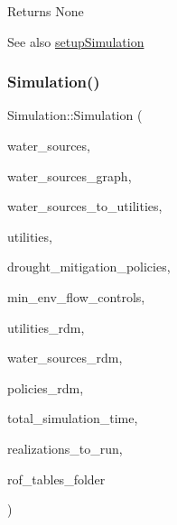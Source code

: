 \begin{DoxyReturn}{Returns}
None
\end{DoxyReturn}
\begin{DoxySeeAlso}{See also}
\mbox{\hyperlink{classSimulation_ac9ff965191f13b1ce044344fd1e5d0ac}{setup\+Simulation}} 
\end{DoxySeeAlso}
\mbox{\label{classSimulation_a68f43435cf8308d5415cdfcdb84e1fac}} 
\subsubsection{\texorpdfstring{Simulation()}{Simulation()}\hspace{0.1cm}{\footnotesize\ttfamily [4/4]}}
{\footnotesize\ttfamily Simulation\+::\+Simulation (\begin{DoxyParamCaption}\item[{vector$<$ \mbox{\hyperlink{classWaterSource}{Water\+Source}} $\ast$$>$ \&}]{water\+\_\+sources,  }\item[{\mbox{\hyperlink{classGraph}{Graph}} \&}]{water\+\_\+sources\+\_\+graph,  }\item[{const vector$<$ vector$<$ int $>$$>$ \&}]{water\+\_\+sources\+\_\+to\+\_\+utilities,  }\item[{vector$<$ \mbox{\hyperlink{classUtility}{Utility}} $\ast$$>$ \&}]{utilities,  }\item[{const vector$<$ \mbox{\hyperlink{classDroughtMitigationPolicy}{Drought\+Mitigation\+Policy}} $\ast$$>$ \&}]{drought\+\_\+mitigation\+\_\+policies,  }\item[{vector$<$ \mbox{\hyperlink{classMinEnvFlowControl}{Min\+Env\+Flow\+Control}} $\ast$$>$ \&}]{min\+\_\+env\+\_\+flow\+\_\+controls,  }\item[{vector$<$ vector$<$ double $>$$>$ \&}]{utilities\+\_\+rdm,  }\item[{vector$<$ vector$<$ double $>$$>$ \&}]{water\+\_\+sources\+\_\+rdm,  }\item[{vector$<$ vector$<$ double $>$$>$ \&}]{policies\+\_\+rdm,  }\item[{const unsigned long}]{total\+\_\+simulation\+\_\+time,  }\item[{vector$<$ unsigned long $>$ \&}]{realizations\+\_\+to\+\_\+run,  }\item[{string \&}]{rof\+\_\+tables\+\_\+folder }\end{DoxyParamCaption})}



